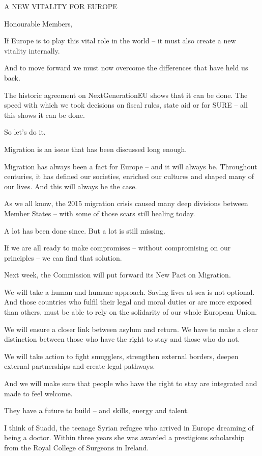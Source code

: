 \documentclass[a4paper,11pt]{article}
\begin{document}
 

A NEW VITALITY FOR EUROPE

Honourable Members,

If Europe is to play this vital role in the world – it must also create a new vitality internally.

And to move forward we must now overcome the differences that have held us back.

The historic agreement on NextGenerationEU shows that it can be done. The speed with which we took decisions on fiscal rules, state aid or for SURE – all this shows it can be done.

So let's do it.

Migration is an issue that has been discussed long enough.

Migration has always been a fact for Europe – and it will always be. Throughout centuries, it has defined our societies, enriched our cultures and shaped many of our lives. And this will always be the case.

As we all know, the 2015 migration crisis caused many deep divisions between Member States – with some of those scars still healing today.

A lot has been done since. But a lot is still missing.

If we are all ready to make compromises – without compromising on our principles – we can find that solution.

Next week, the Commission will put forward its New Pact on Migration.

We will take a human and humane approach. Saving lives at sea is not optional. And those countries who fulfil their legal and moral duties or are more exposed than others, must be able to rely on the solidarity of our whole European Union.

We will ensure a closer link between asylum and return. We have to make a clear distinction between those who have the right to stay and those who do not.

We will take action to fight smugglers, strengthen external borders, deepen external partnerships and create legal pathways.

And we will make sure that people who have the right to stay are integrated and made to feel welcome.

They have a future to build – and skills, energy and talent.

I think of Suadd, the teenage Syrian refugee who arrived in Europe dreaming of being a doctor. Within three years she was awarded a prestigious scholarship from the Royal College of Surgeons in Ireland.
\end{document}
